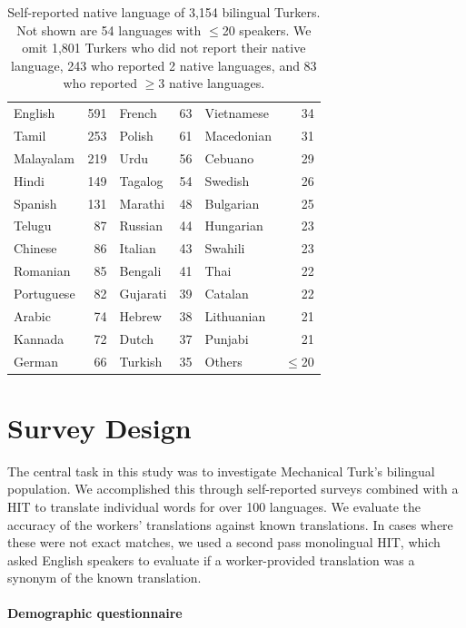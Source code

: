 \documentclass[11pt]{article}
\begin{document}
\begin{table}
\footnotesize
\begin{tabular}{lrlrlr}\hline\hline
\hline
English&591&	French&63&	Vietnamese&34\\
Tamil&253&	Polish&61&	Macedonian&31\\
Malayalam&219&	Urdu&56&	Cebuano&29\\
Hindi&149&	Tagalog&54&	Swedish&26\\
Spanish&131&	Marathi&48&	Bulgarian&25\\
Telugu&87&	Russian&44&	Hungarian&23\\
Chinese&86&	Italian&43&	Swahili&23\\
Romanian&85&	Bengali&41&	Thai&22\\
Portuguese&82&	Gujarati&39&	Catalan&22\\
Arabic&74&	Hebrew&38&	Lithuanian&21\\
Kannada&72&	Dutch&37&	Punjabi&21\\
German&66&	Turkish&35&	Others &$\leq$20\\
\hline\hline
\end{tabular}
\normalsize
\caption{Self-reported native language of 3,154 bilingual Turkers. Not shown are 54 languages with $\leq$20 speakers. 
We omit 1,801 Turkers who did not report their native language, 243 who reported 2 native languages, and 83 who reported $\geq$3 native languages.}\label{lang-pie}
\end{table}



\section{Survey Design}
The central task in this study was to investigate Mechanical Turk's bilingual population.  We accomplished this through self-reported surveys combined with a HIT to translate individual words for over 100 languages.  We evaluate the accuracy of the workers' translations against known translations.  In cases where these were not exact matches, we used a second pass monolingual HIT, which asked English speakers to evaluate if a worker-provided translation was a synonym of the known translation.


\paragraph{Demographic questionnaire}
\end{document}
